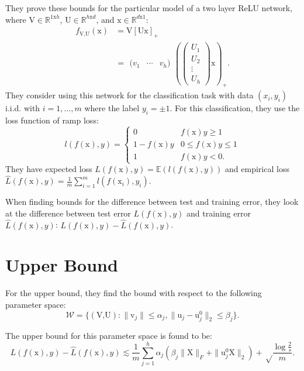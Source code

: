 \documentclass[twoside]{article}
\theoremstyle{definition}
\theoremstyle{definition}
\theoremstyle{remark}
\begin{document}
They prove these bounds for the particular model of a two layer ReLU network, where $\text{V} \in \mathbb{R}^{1 \text{x} h}$, $\text{U} \in \mathbb{R}^{h \text{x} d}$, and $\text{x} \in \mathbb{R}^{d \text{x} 1}$:
\[
\begin{aligned}
f_\text{V,U}(\text{x})&=\text{V}[\text{Ux}]_+ \\
&= \begin{smallmatrix}(v_1 & \cdots & v_h)\end{smallmatrix}
(\left(\begin{smallmatrix}U_1 \\ U_2 \\ \vdots \\ U_h\end{smallmatrix}\right)
\text{x})_+.
\end{aligned}
\]
They consider using this network for the classification task with data $(x_i, y_i)$ i.i.d. with $i = 1,\ldots,m$ where the label $y_i = \pm1$. For this classification, they use the loss function of ramp loss:
\[
l(f(\text{x}),y) = \begin{cases}
0 & f(\text{x})y \geq 1 \\
1-f(\text{x})y & 0 \leq f(\text{x})y \leq 1 \\
1 & f(\text{x})y < 0.
\end{cases}
\]
They have expected loss $L(f(\text{x}),y) = \mathbb{E}(l(f(\text{x}),y))$ and empirical loss $\hat L(f(\text{x}),y) = \frac{1}{m}\sum\limits_{i=1}^m l(f(\text{x}_i),y_i)$.

When finding bounds for the difference between test and training error, they look at the difference between test error $L(f(\text{x}),y)$ and training error $\hat L(f(\text{x}),y)$: $L(f(\text{x}),y) - \hat L(f(\text{x}),y)$.

\section{Upper Bound}

For the upper bound, they find the bound with respect to the following parameter space:
\[
\mathcal{W} = \{ (\text{V,U}) : \|\text{v}_j\| \leq \alpha_j , \|\text{u}_j - \text{u}_j^0\|_2 \leq \beta_j \}.
\]

The upper bound for this parameter space is found to be:
\begin{equation}
L(f(\text{x}),y) - \hat L(f(\text{x}),y) \lesssim \frac{1}{m} \sum\limits_{j=1}^h \alpha_j (\beta_j \| \text{X} \|_F + \| \text{u}_j^0 \text{X} \|_2) + \sqrt\frac{\log \frac{2}{s}}{m}.
\end{equation}
\end{document}
